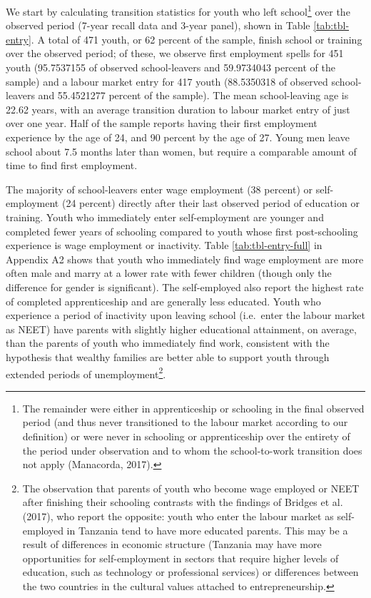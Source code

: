 \documentclass[
  a4paper, twoside, 12pt]{book}
\begin{document}
We start by calculating transition statistics for youth who left school\footnote{The remainder were either in apprenticeship or schooling in the final observed period (and thus never transitioned to the labour market according to our definition) or were never in schooling or apprenticeship over the entirety of the period under observation and to whom the school-to-work transition does not apply (Manacorda, 2017).} over the observed period (7-year recall data and 3-year panel), shown in Table \ref{tab:tbl-entry}. A total of 471 youth, or 62 percent of the sample, finish school or training over the observed period; of these, we observe first employment spells for 451 youth (95.7537155 of observed school-leavers and 59.9734043 percent of the sample) and a labour market entry for 417 youth (88.5350318 of observed school-leavers and 55.4521277 percent of the sample). The mean school-leaving age is 22.62 years, with an average transition duration to labour market entry of just over one year. Half of the sample reports having their first employment experience by the age of 24, and 90 percent by the age of 27. Young men leave school about 7.5 months later than women, but require a comparable amount of time to find first employment.

The majority of school-leavers enter wage employment (38 percent) or self-employment (24 percent) directly after their last observed period of education or training. Youth who immediately enter self-employment are younger and completed fewer years of schooling compared to youth whose first post-schooling experience is wage employment or inactivity. Table \ref{tab:tbl-entry-full} in Appendix A2 shows that youth who immediately find wage employment are more often male and marry at a lower rate with fewer children (though only the difference for gender is significant). The self-employed also report the highest rate of completed apprenticeship and are generally less educated. Youth who experience a period of inactivity upon leaving school (i.e.~enter the labour market as NEET) have parents with slightly higher educational attainment, on average, than the parents of youth who immediately find work, consistent with the hypothesis that wealthy families are better able to support youth through extended periods of unemployment\footnote{The observation that parents of youth who become wage employed or NEET after finishing their schooling contrasts with the findings of Bridges et al. (2017), who report the opposite: youth who enter the labour market as self-employed in Tanzania tend to have more educated parents.  This may be a result of differences in economic structure (Tanzania may have more opportunities for self-employment in sectors that require higher levels of education, such as technology or professional services) or differences between the two countries in the cultural values attached to entrepreneurship.}.
\end{document}
